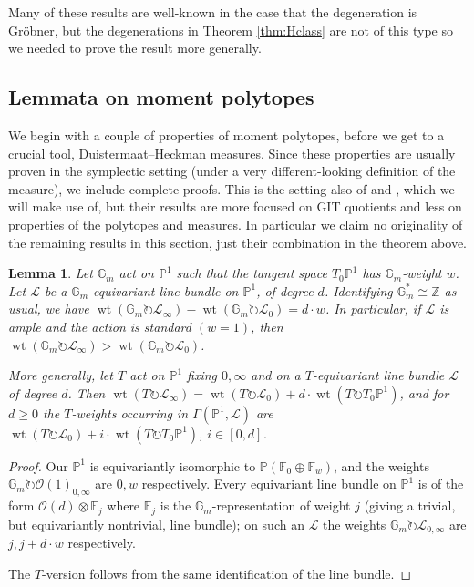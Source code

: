 \documentclass[10pt,a4paper]{amsart}
\newtheorem{lemma}[Thm]{Lemma}
\DeclareMathOperator{\wt}{wt}
\newcommand{\ZZ}{\mathbb{Z}}
\newcommand{\PP}{\mathbb{P}}
\newcommand\FF{{\mathbb F}}
\newcommand\tensor\otimes
\newcommand\calO{{\mathcal O}}
\newcommand\calL{{\mathcal L}}
\newcommand\Gm{{\mathbb G}_m}
\newcommand\iso\cong
\newcommand\actson\circlearrowright
\begin{document}
Many of these results are well-known \cite{sturmfels1991grobner}
in the case that the degeneration is Gr\"obner, but the degenerations
in Theorem \ref{thm:Hclass} are not of this type so we needed to prove
the result more generally.

\subsection{Lemmata on moment polytopes}

We begin with a couple of properties of moment polytopes, before we get
to a crucial tool, Duistermaat--Heckman measures.
Since these properties are usually proven in the symplectic setting
(under a very different-looking definition of the measure), we include
complete proofs. This is the setting also of \cite{brion1990action}
and \cite{dolgachev1998variation}, which we will make use of,
but their results are more focused on GIT quotients and less on properties of
the polytopes and measures. In particular we claim no originality of
the remaining results in this section, just their combination in
the theorem above.

\begin{lemma}\label{lem:eqvtLineBundles}
  Let $\Gm$ act on $\PP^1$ such that the tangent space $T_0\PP^1$ has
  $\Gm$-weight $w$.
  Let $\calL$ be a $\Gm$-equivariant line bundle on $\PP^1$, of degree $d$.
  Identifying $\Gm^* \iso \ZZ$ as usual, we have
  $\wt(\Gm\actson \calL_\infty)-\wt(\Gm\actson \calL_0) = d\cdot w$.
  In particular, if $\calL$ is ample and the action is standard $(w=1)$,
  then $\wt(\Gm\actson \calL_\infty) > \wt(\Gm\actson \calL_0)$.

  More generally, let $T$ act on $\PP^1$ fixing $0,\infty$ and
  on a $T$-equivariant line bundle $\calL$ of degree $d$.
  Then 
  $\wt(T\actson \calL_\infty)
  = \wt(T\actson \calL_0) + d\cdot \wt(T\actson T_0 \PP^1)$, and for $d\geq 0$
  the $T$-weights occurring in $\Gamma(\PP^1, \calL)$ are
  $\wt(T\actson \calL_0) + i\cdot \wt(T\actson T_0 \PP^1)$, $i \in [0,d]$.
\end{lemma}

\begin{proof}
  Our $\PP^1$ is equivariantly isomorphic to $\PP(\FF_0\oplus \FF_w)$,
  and the weights $\Gm \actson \calO(1)_{0,\infty}$ are $0,w$ respectively.
  Every equivariant line bundle on $\PP^1$ is of the form
  $\calO(d) \tensor \FF_j$ where $\FF_j$ is the $\Gm$-representation
  of weight $j$ (giving a trivial, but equivariantly nontrivial, line bundle);
  on such an $\calL$ the weights $\Gm \actson \calL_{0,\infty}$
  are $j,j+d\cdot w$ respectively.

  The $T$-version follows from the same identification of the line bundle.
\end{proof}
\end{document}
